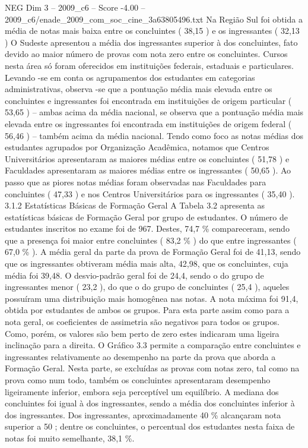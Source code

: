 \begin{textsample}{NEG Dim 3 – 2009\_c6 – Score -4.00 – 2009\_c6/enade\_2009\_com\_soc\_cine\_3a63805496.txt}
Na Região Sul foi obtida a média de notas mais baixa entre os concluintes ( 38,15 ) e os ingressantes ( 32,13 ) O Sudeste apresentou a média dos ingressantes superior à dos concluintes, fato devido ao maior número de provas com nota zero entre os concluintes.
Cursos nesta área só foram oferecidos em instituições federais, estaduais e particulares.
Levando -se em conta os agrupamentos dos estudantes em categorias administrativas, observa -se que a pontuação média mais elevada entre os concluintes e ingressantes foi encontrada em instituições de origem particular ( 53,65 ) – ambas acima da média nacional, se observa que a pontuação média mais elevada entre os ingressantes foi encontrada em instituições de origem federal ( 56,46 ) – também acima da média nacional.
Tendo como foco as notas médias dos estudantes agrupados por Organização Acadêmica, notamos que Centros Universitários apresentaram as maiores médias entre os concluintes ( 51,78 ) e Faculdades apresentaram as maiores médias entre os ingressantes ( 50,65 ).
Ao passo que as piores notas médias foram observadas nas Faculdades para concluintes ( 47,33 ) e nos Centros Universitários para os ingressantes ( 35,40 ). 3.1.2 Estatísticas Básicas de Formação Geral A Tabela 3.2 apresenta as estatísticas básicas de Formação Geral por grupo de estudantes.
O número de estudantes inscritos no exame foi de 967.
Destes, 74,7 \% compareceram, sendo que a presença foi maior entre concluintes ( 83,2 \% ) do que entre ingressantes ( 67,0 \% ).
A média geral da parte da prova de Formação Geral foi de 41,13, sendo que os ingressantes obtiveram média mais alta, 42,98, que os concluintes, cuja média foi 39,48.
O desvio-padrão geral foi de 24,4, sendo o do grupo de ingressantes menor ( 23,2 ), do que o do grupo de concluintes ( 25,4 ), aqueles possuíram uma distribuição mais homogênea nas notas.
A nota máxima foi 91,4, obtida por estudantes de ambos os grupos.
Para esta parte assim como para a nota geral, os coeficientes de assimetria são negativos para todos os grupos.
Como, porém, os valores são bem perto de zero estes indicaram uma ligeira inclinação para a direita.
O Gráfico 3.3 permite a comparação entre concluintes e ingressantes relativamente ao desempenho na parte da prova que aborda a Formação Geral.
Nesta parte, se excluídas as provas com notas zero, tal como na prova como num todo, também os concluintes apresentaram desempenho ligeiramente inferior, embora seja perceptível um equilíbrio.
A mediana dos concluintes foi igual à dos ingressantes, sendo a média dos concluintes inferior à dos ingressantes.
Dos ingressantes, aproximadamente 40 \% alcançaram nota superior a 50 ; dentre os concluintes, o percentual dos estudantes nesta faixa de notas foi muito semelhante, 38,1 \%.

\end{textsample}
